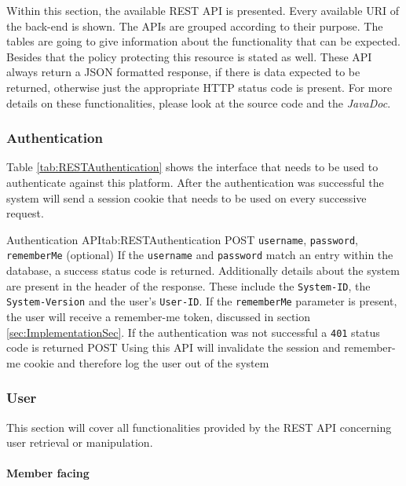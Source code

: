 Within this section, the available \gls{REST} \gls{API} is presented. Every available \gls{URI} of the back-end is shown. The \gls{API}s are grouped according to their purpose. The tables are going to give information about the functionality that can be expected. Besides that the policy protecting this resource is stated as well. These \gls{API} always return a \gls{JSON} formatted response, if there is data expected to be returned, otherwise just the appropriate HTTP status code is present. For more details on these functionalities, please look at the source code and the \emph{JavaDoc}.

\subsubsection{Authentication}

Table \vref{tab:RESTAuthentication} shows the interface that needs to be used to authenticate against this platform. After the authentication was successful the system will send a session cookie that needs to be used on every successive request.

\begin{RESTTable}{Authentication API}{tab:RESTAuthentication}
		{POST}
		{\texttt{username}, \texttt{password}, \texttt{rememberMe} (optional)}
		{If the \texttt{username} and \texttt{password} match an entry within the database, a success status code is returned. Additionally details about the system are present in the header of the response. These include the \texttt{System-ID}, the \texttt{System-Version} and the user's \texttt{User-ID}. If the \texttt{rememberMe} parameter is present, the user will receive a remember-me token, discussed in section \vref{sec:ImplementationSec}. If the authentication was not successful a \texttt{401} status code is returned}
		{POST}
		{}
		{Using this \gls{API} will invalidate the session and remember-me cookie and therefore log the user out of the system}
\end{RESTTable}



\subsubsection{User}
This section will cover all functionalities provided by the \gls{REST} \gls{API} concerning user retrieval or manipulation.

\paragraph{Member facing}

